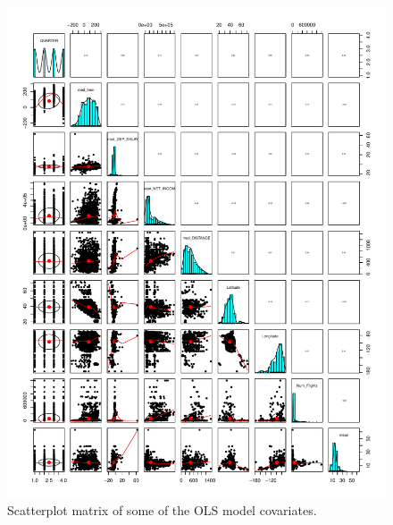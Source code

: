 \documentclass[12pt, a4paper, openany]{book}
\begin{document}
	 		
			\begin{figure}[h]
			\centering
	 		\includegraphics[width = 1\textwidth]{../figures/giantpairs}
	 		\caption{Scatterplot matrix of some of the OLS model covariates.}
	 		\end{figure}	
\end{document}
